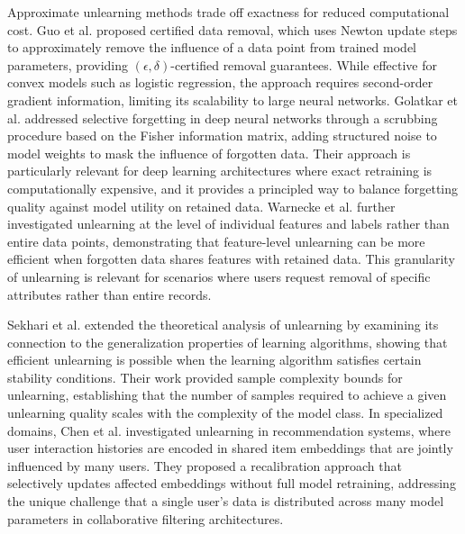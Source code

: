 Approximate unlearning methods trade off exactness for reduced computational cost. Guo et al. \cite{guo2020certified} proposed certified data removal, which uses Newton update steps to approximately remove the influence of a data point from trained model parameters, providing $(\epsilon, \delta)$-certified removal guarantees. While effective for convex models such as logistic regression, the approach requires second-order gradient information, limiting its scalability to large neural networks. Golatkar et al. \cite{golatkar2020eternal} addressed selective forgetting in deep neural networks through a scrubbing procedure based on the Fisher information matrix, adding structured noise to model weights to mask the influence of forgotten data. Their approach is particularly relevant for deep learning architectures where exact retraining is computationally expensive, and it provides a principled way to balance forgetting quality against model utility on retained data. Warnecke et al. \cite{warnecke2021machine} further investigated unlearning at the level of individual features and labels rather than entire data points, demonstrating that feature-level unlearning can be more efficient when forgotten data shares features with retained data. This granularity of unlearning is relevant for scenarios where users request removal of specific attributes rather than entire records.

Sekhari et al. \cite{sekhari2021remember} extended the theoretical analysis of unlearning by examining its connection to the generalization properties of learning algorithms, showing that efficient unlearning is possible when the learning algorithm satisfies certain stability conditions. Their work provided sample complexity bounds for unlearning, establishing that the number of samples required to achieve a given unlearning quality scales with the complexity of the model class. In specialized domains, Chen et al. \cite{chen2022recommendation} investigated unlearning in recommendation systems, where user interaction histories are encoded in shared item embeddings that are jointly influenced by many users. They proposed a recalibration approach that selectively updates affected embeddings without full model retraining, addressing the unique challenge that a single user's data is distributed across many model parameters in collaborative filtering architectures.

